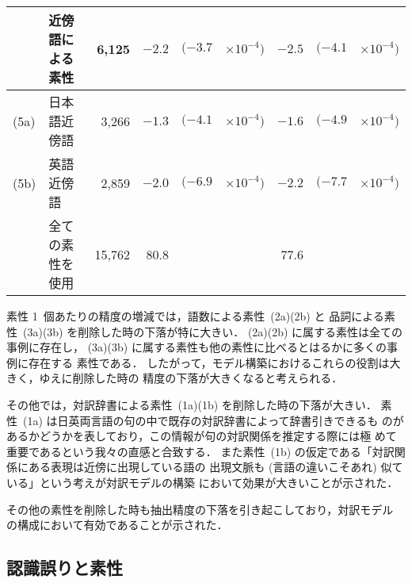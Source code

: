 \begin{table*}[tbp]
{\begin{tabular}{|ll|r|rr@{}l|rr@{}l|}
    & 近傍語による素性 & 6,125 &
    $-2.2$ & $(-3.7$ & $\times 10^{-4})$ &
    $-2.5$ & $(-4.1$ & $\times 10^{-4})$ \\ \hline
    (5a) & 日本語近傍語 & 3,266 &
    $-1.3$ & $(-4.1$ & $\times 10^{-4})$ &
    $-1.6$ & $(-4.9$ & $\times 10^{-4})$ \\
    (5b) & 英語近傍語 & 2,859 &
    $-2.0$ & $(-6.9$ & $\times 10^{-4})$ &
    $-2.2$ & $(-7.7$ & $\times 10^{-4})$ \\ \hline\hline

    & 全ての素性を使用 & 15,762 &
    80.8 & & & 77.6 & &\\ \hline
  \end{tabular}}
\end{table*}

素性 1~個あたりの精度の増減では，語数による素性~(2a)(2b) と
品詞による素性~(3a)(3b) を削除した時の下落が特に大きい．
(2a)(2b) に属する素性は全ての事例に存在し，
(3a)(3b) に属する素性も他の素性に比べるとはるかに多くの事例に存在する
素性である．
したがって，モデル構築におけるこれらの役割は大きく，ゆえに削除した時の
精度の下落が大きくなると考えられる．

その他では，対訳辞書による素性~(1a)(1b) を削除した時の下落が大きい．
素性~(1a) は日英両言語の句の中で既存の対訳辞書によって辞書引きできるも 
のがあるかどうかを表しており，この情報が句の対訳関係を推定する際には極
めて重要であるという我々の直感と合致する．
また素性~(1b) の仮定である「対訳関係にある表現は近傍に出現している語の
出現文脈も (言語の違いこそあれ) 似ている」という考えが対訳モデルの構築
において効果が大きいことが示された．

その他の素性を削除した時も抽出精度の下落を引き起こしており，対訳モデル
の構成において有効であることが示された．

\subsection{認識誤りと素性}
\label{sec:mistake}

